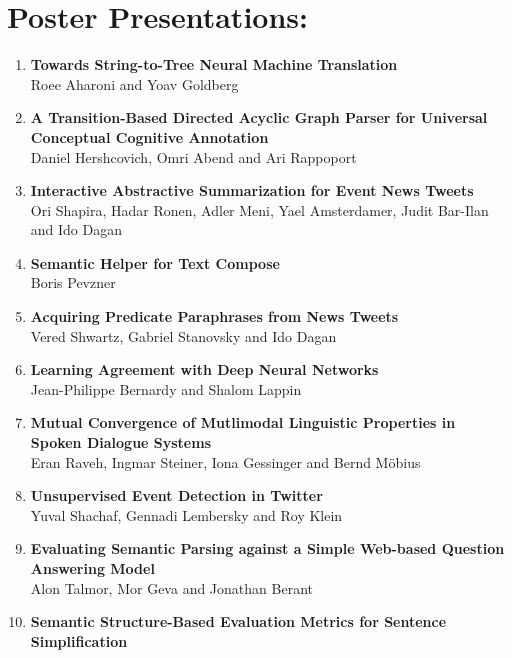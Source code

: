 \documentclass[a0,portrait]{a0poster}
\begin{document}
    \section*{Poster Presentations:}

    {\small
    \begin{multicols}{2}
    \begin{enumerate}
        \item
        \textbf{Towards String-to-Tree Neural Machine Translation}\\
        Roee Aharoni and Yoav Goldberg
        \item
        \textbf{A Transition-Based Directed Acyclic Graph Parser for Universal
        Conceptual Cognitive Annotation}\\
        Daniel Hershcovich, Omri Abend and Ari Rappoport
        \item
        \textbf{Interactive Abstractive Summarization for Event News Tweets}\\
        Ori Shapira, Hadar Ronen, Adler Meni, Yael Amsterdamer, Judit Bar-Ilan
        and Ido Dagan
        \item
        \textbf{Semantic Helper for Text Compose}\\
        Boris Pevzner
        \item
        \textbf{Acquiring Predicate Paraphrases from News Tweets}\\
        Vered Shwartz, Gabriel Stanovsky and Ido Dagan
        \item
        \textbf{Learning Agreement with Deep Neural Networks}\\
        Jean-Philippe Bernardy and Shalom Lappin
        \item
        \textbf{Mutual Convergence of Mutlimodal Linguistic Properties in
        Spoken Dialogue Systems}\\
        Eran Raveh, Ingmar Steiner, Iona Gessinger and Bernd M\"obius
        \item
        \textbf{Unsupervised Event Detection in Twitter}\\
        Yuval Shachaf, Gennadi Lembersky and Roy Klein
        \item
        \textbf{Evaluating Semantic Parsing against a Simple Web-based
        Question Answering Model}\\
        Alon Talmor, Mor Geva and Jonathan Berant
        \item
        \textbf{Semantic Structure-Based Evaluation Metrics for Sentence
        Simplification}\\

\end{enumerate}
\end{multicols}}
\end{document}
